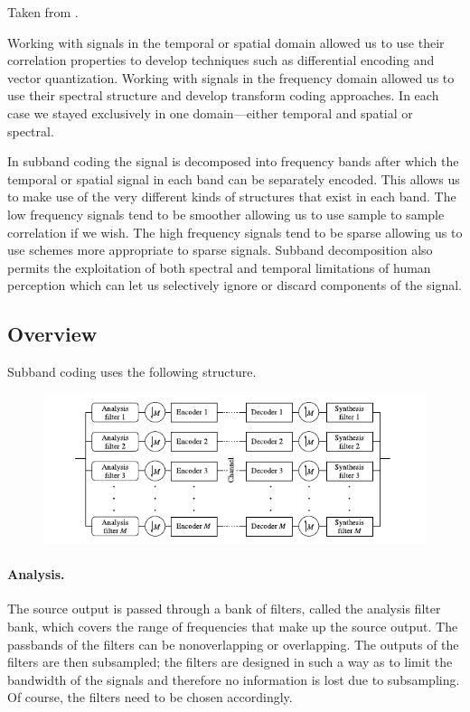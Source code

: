 
Taken from \cite{sayood2012introduction}.

Working with signals in the temporal or spatial domain allowed us to use their correlation properties to develop techniques such as differential encoding and vector quantization. Working with signals in the frequency domain allowed us to use their spectral structure and develop transform coding approaches. In each case we stayed exclusively in one domain—either temporal and spatial or spectral.


In subband coding the signal is decomposed into frequency bands after which the temporal or spatial signal in each band can be separately encoded. This allows us to make use of the very different kinds of structures that exist in each band. The low frequency signals tend to be smoother allowing us to use sample to sample correlation if we wish. The high frequency signals tend to be sparse allowing us to use schemes more appropriate to sparse signals. Subband decomposition also permits the exploitation of both spectral and temporal limitations of human perception which can let us selectively ignore or discard components of the signal.


\subsection{Overview}

Subband coding uses the following structure.


\begin{figure}[H]
    \centering
    \includegraphics[scale=0.7]{images/2021-11-09-subband_01.png}
\end{figure}


\paragraph{Analysis.} The source output is passed through a bank of filters, called the analysis filter bank, which covers the range of frequencies that make up the source output. The passbands of the filters can be nonoverlapping or overlapping. The outputs of the filters are then subsampled; the filters are designed in such a way as to limit the bandwidth of the signals and therefore no information is lost due to subsampling. Of course, the filters need to be chosen accordingly.



